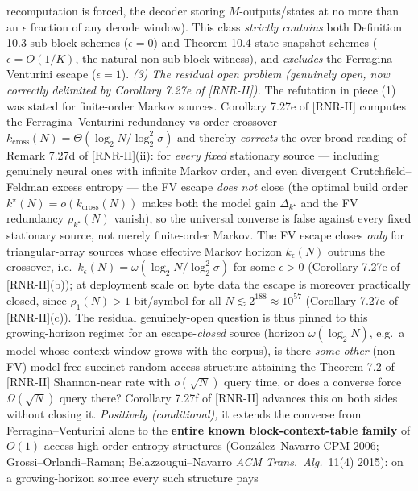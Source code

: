 \documentclass[
]{article}
\begin{document}
\begin{itemize}
  recomputation is forced, the decoder storing $M$-outputs/states at no
  more than an $\epsilon$ fraction of any decode window). This class
  \emph{strictly contains} both Definition 10.3 sub-block schemes
  ($\epsilon = 0$) and Theorem 10.4 state-snapshot schemes ($\epsilon =
  O(1/K)$, the natural non-sub-block witness), and \emph{excludes} the
  Ferragina--Venturini escape ($\epsilon = 1$). \emph{(3) The residual
  open problem (genuinely open, now correctly delimited by Corollary
  7.27e of [RNR-II]).} The refutation in piece (1) was stated for finite-order Markov
  sources. Corollary 7.27e of [RNR-II] computes the Ferragina--Venturini
  redundancy-vs-order crossover $k_{\mathrm{cross}}(N) = \Theta(\log_2 N /
  \log_2^2\sigma)$ and thereby \emph{corrects} the over-broad reading of
  Remark 7.27d of [RNR-II](ii): for \emph{every fixed} stationary source --- including
  genuinely neural ones with infinite Markov order, and even divergent
  Crutchfield--Feldman excess entropy --- the FV escape \emph{does not}
  close (the optimal build order $k^\star(N) = o(k_{\mathrm{cross}}(N))$
  makes both the model gain $\Delta_{k^\star}$ and the FV redundancy
  $\rho_{k^\star}(N)$ vanish), so the universal converse is false against
  every fixed stationary source, not merely finite-order Markov. The FV
  escape closes \emph{only} for triangular-array sources whose effective
  Markov horizon $k_\epsilon(N)$ outruns the crossover, i.e.\
  $k_\epsilon(N) = \omega(\log_2 N / \log_2^2\sigma)$ for some $\epsilon
  > 0$ (Corollary 7.27e of [RNR-II](b)); at deployment scale on byte data the escape
  is moreover practically closed, since $\rho_1(N) > 1$ bit/symbol for all
  $N \lesssim 2^{188} \approx 10^{57}$ (Corollary 7.27e of [RNR-II](c)). The residual
  genuinely-open
  question is thus pinned to this growing-horizon regime: for an
  escape-\emph{closed} source (horizon $\omega(\log_2 N)$, e.g.\ a model
  whose context window grows with the corpus), is there \emph{some other}
  (non-FV) model-free succinct random-access structure attaining the
  Theorem 7.2 of [RNR-II] Shannon-near rate with $o(\sqrt{N})$ query time, or does a
  converse force $\Omega(\sqrt N)$ query there? Corollary 7.27f of [RNR-II] advances
  this on both sides without closing it. \emph{Positively (conditional),}
  it extends the converse from Ferragina--Venturini alone to the
  \textbf{entire known block-context-table family} of $O(1)$-access
  high-order-entropy structures (Gonz\'alez--Navarro CPM 2006;
  Grossi--Orlandi--Raman; Belazzougui--Navarro \emph{ACM Trans.\ Alg.}\
  11(4) 2015): on a growing-horizon source every such structure pays

\end{itemize}
\end{document}
